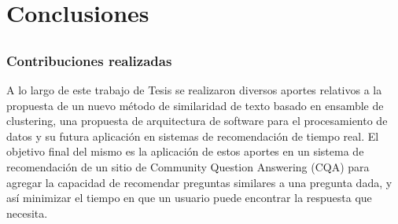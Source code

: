 \chapter*{Conclusiones}\label{ch:conclusiones}

\section*{}
\addtocounter{section}{1}
\setcounter{subsection}{0}

\subsection{Contribuciones realizadas}
A lo largo de este trabajo de Tesis se realizaron diversos aportes relativos a la propuesta de un nuevo método de similaridad de texto basado en ensamble de clustering, una propuesta de arquitectura de software para el procesamiento de datos y su futura aplicación en sistemas de recomendación de tiempo real. El objetivo final del mismo es la aplicación de estos aportes en un sistema de recomendación de un sitio de Community Question Answering (CQA) para agregar la capacidad de recomendar preguntas similares a una pregunta dada, y así minimizar el tiempo en que un usuario puede encontrar la respuesta que necesita.

